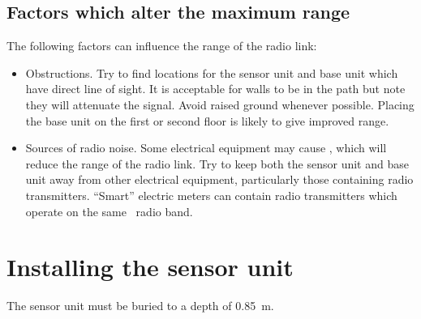 
\subsection{Factors which alter the maximum range}
The following factors can influence the range of the radio link:
\begin{itemize}
\item Obstructions. Try to find locations for the sensor unit and base
  unit which have direct line of sight. It is acceptable for walls to
  be in the path but note they will attenuate the signal. Avoid raised
  ground whenever possible. Placing the base unit on the first or
  second floor is likely to give improved range.
\item Sources of radio noise. Some electrical equipment may cause
  \rfi, which will reduce the range of the radio link. Try to keep
  both the sensor unit and base unit away from other electrical
  equipment, particularly those containing radio
  transmitters. ``Smart'' electric meters can contain radio
  transmitters which operate on the same  \ism\ radio band.
\end{itemize}


\section{Installing the sensor unit}

The sensor unit must be buried to a depth of \SI{0.85}{\metre}.

